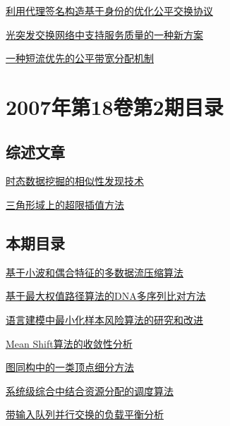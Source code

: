 \documentclass[a4paper]{article}
\begin{document}
\href{http://www.jos.org.cn/ch/reader/download_pdf.aspx?file_no=20070328&year_id=2007&quarter_id=3&falg=1}{利用代理签名构造基于身份的优化公平交换协议}

\href{http://www.jos.org.cn/ch/reader/download_pdf.aspx?file_no=20070329&year_id=2007&quarter_id=3&falg=1}{光突发交换网络中支持服务质量的一种新方案}

\href{http://www.jos.org.cn/ch/reader/download_pdf.aspx?file_no=20070330&year_id=2007&quarter_id=3&falg=1}{一种短流优先的公平带宽分配机制}


\section{\textbf{2007年第18卷第2期目录}}
\subsection{综述文章}
\href{http://www.jos.org.cn/ch/reader/download_pdf.aspx?file_no=20070209&year_id=2007&quarter_id=2&falg=1}{时态数据挖掘的相似性发现技术}

\href{http://www.jos.org.cn/ch/reader/download_pdf.aspx?file_no=20070227&year_id=2007&quarter_id=2&falg=1}{三角形域上的超限插值方法}

\subsection{本期目录}
\href{http://www.jos.org.cn/ch/reader/download_pdf.aspx?file_no=20070201&year_id=2007&quarter_id=2&falg=1}{基于小波和偶合特征的多数据流压缩算法}

\href{http://www.jos.org.cn/ch/reader/download_pdf.aspx?file_no=20070202&year_id=2007&quarter_id=2&falg=1}{基于最大权值路径算法的DNA多序列比对方法}

\href{http://www.jos.org.cn/ch/reader/download_pdf.aspx?file_no=20070203&year_id=2007&quarter_id=2&falg=1}{语言建模中最小化样本风险算法的研究和改进}

\href{http://www.jos.org.cn/ch/reader/download_pdf.aspx?file_no=20070204&year_id=2007&quarter_id=2&falg=1}{Mean Shift算法的收敛性分析}

\href{http://www.jos.org.cn/ch/reader/download_pdf.aspx?file_no=20070205&year_id=2007&quarter_id=2&falg=1}{图同构中的一类顶点细分方法}

\href{http://www.jos.org.cn/ch/reader/download_pdf.aspx?file_no=20070206&year_id=2007&quarter_id=2&falg=1}{系统级综合中结合资源分配的调度算法}

\href{http://www.jos.org.cn/ch/reader/download_pdf.aspx?file_no=20070207&year_id=2007&quarter_id=2&falg=1}{带输入队列并行交换的负载平衡分析}
\end{document}
